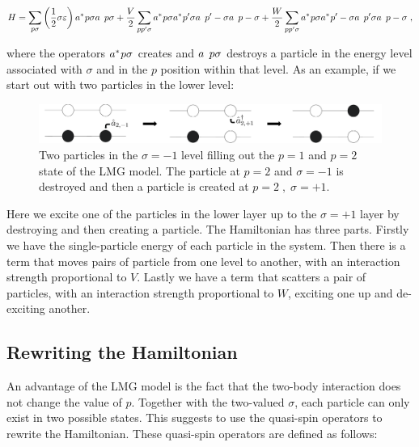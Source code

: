 \begin{equation} \label{eq:creationanhilHamiltonian}
    H = \sum_{p\sigma} \left ( \frac{1}{2} \sigma \varepsilon \right ) \hc{a}{p\sigma}\op{a}{p\sigma} + \frac{V}{2}\sum_{pp'\sigma} \hc{a}{p\sigma} \hc{a}{p'\sigma} \op{a}{p'-\sigma}\op{a}{p-\sigma} + \frac{W}{2} \sum_{pp'\sigma} \hc{a}{p\sigma} \hc{a}{p'-\sigma} \op{a}{p'\sigma}\op{a}{p-\sigma} \; , 
\end{equation}

where the operators $\hc{a}{p\sigma}$ creates and $\op{a}{p\sigma}$ destroys a particle in the energy level associated with $\sigma$ and in the $p$ position within that level. As an example, if we start out with two particles in the lower level:

\begin{figure}[H]
    \centering
    \includegraphics[width=\textwidth]{Figures/Drawn/Lipkin/lipkinexcited.pdf}
    \caption{Two particles in the $\sigma = -1$ level filling out the $p = 1$ and $p=2$ state of the LMG model. The particle at $p = 2$ and $\sigma = -1$ is destroyed and then a particle is created at $p=2 \; , \; \sigma = +1$.}
    \label{fig:lipkinbase}
\end{figure}

Here we excite one of the particles in the lower layer up to the $\sigma = +1$ layer by destroying and then creating a particle. The Hamiltonian has three parts. Firstly we have the single-particle energy of each particle in the system. Then there is a term that moves pairs of particle from one level to another, with an interaction strength proportional to $V$. Lastly we have a term that scatters a pair of particles, with an interaction strength proportional to $W$, exciting one up and de-exciting another.

\subsection{Rewriting the Hamiltonian}

An advantage of the LMG model is the fact that the two-body interaction does not change the value of $p$. Together with the two-valued $\sigma$, each particle can only exist in two possible states. This suggests to use the quasi-spin operators to rewrite the Hamiltonian. These quasi-spin operators are defined as follows:

